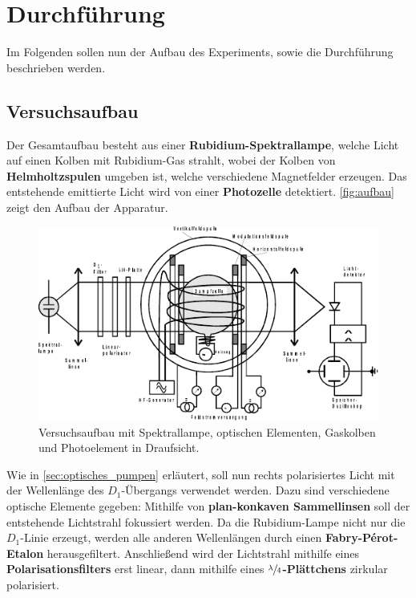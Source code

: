 \section{Durchführung}
\label{sec:durchfuehrung}

    Im Folgenden sollen nun der Aufbau des Experiments,
    sowie die Durchführung beschrieben werden.

\subsection{Versuchsaufbau}

    Der Gesamtaufbau besteht aus einer \textbf{Rubidium-Spektrallampe},
    welche Licht auf einen Kolben mit Rubidium-Gas strahlt,
    wobei der Kolben von \textbf{Helmholtzspulen} umgeben ist,
    welche verschiedene Magnetfelder erzeugen.
    Das entstehende emittierte Licht wird von einer \textbf{Photozelle} detektiert.
    \autoref{fig:aufbau} zeigt den Aufbau der Apparatur.
    \begin{figure}
        \centering
        \includegraphics[width=\textwidth]{content/img/Abb_1.pdf}
        \caption{Versuchsaufbau mit Spektrallampe, optischen Elementen, Gaskolben und Photoelement in Draufsicht. \cite{versuchsanleitung}}
        \label{fig:aufbau}
    \end{figure}

    Wie in \autoref{sec:optisches_pumpen} erläutert,
    soll nun rechts polarisiertes Licht mit der Wellenlänge des $D_1$-Übergangs verwendet werden.
    Dazu sind verschiedene optische Elemente gegeben:
    Mithilfe von \textbf{plan-konkaven Sammellinsen} soll der entstehende Lichtstrahl fokussiert werden.
    Da die Rubidium-Lampe nicht nur die $D_1$-Linie erzeugt,
    werden alle anderen Wellenlängen durch einen \textbf{Fabry-Pérot-Etalon} herausgefiltert.
    Anschließend wird der Lichtstrahl mithilfe eines \textbf{Polarisationsfilters} erst linear,
    dann mithilfe eines \textbf{$\sfrac{\lambda}{4}$-Plättchens} zirkular polarisiert.

